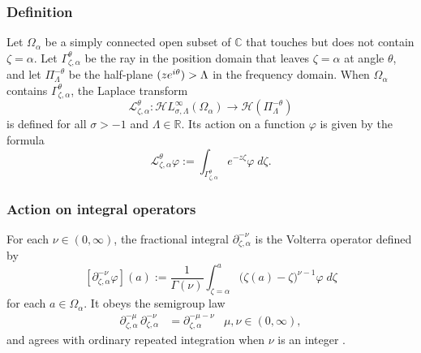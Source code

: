 \documentclass[final]{siamart220329}
\newcommand{\maps}{\colon}
\newcommand{\R}{\mathbb{R}}
\newcommand{\C}{\mathbb{C}}
\let\Re\relax
\DeclareMathOperator{\Re}{Re}
\newcommand{\laplace}{\mathcal{L}}
\newcommand{\fracderiv}[3]{\partial^{#1}_{#2, #3}}
\newcommand{\holo}{\mathcal{H}}
\newcommand{\singexp}[2]{\mathcal{H}L^\infty_{#1, #2}}
\newcommand{\domain}{\Omega}
\begin{document}
\subsubsection{Definition}\label{sec:definition_Laplace}
Let $\domain_\alpha$ be a simply connected open subset of $\C$ that touches but does not contain $\zeta=\alpha$. Let $\Gamma_{\zeta, \alpha}^\theta$ be the ray in the position domain that leaves $\zeta=\alpha$ at angle $\theta$, and let $\Pi^{-\theta}_\Lambda$ be the half-plane $\Re(z e^{i\theta}) > \Lambda$ in the frequency domain. When $\domain_\alpha$ contains $\Gamma_{\zeta, \alpha}^\theta$, the Laplace transform
\[ \laplace_{\zeta, \alpha}^{\theta} \maps \singexp{\sigma}{\Lambda}(\domain_\alpha) \to \holo(\Pi^{-\theta}_\Lambda) \]
is defined for all $\sigma > -1$ and $\Lambda \in \R$. Its action on a function $\varphi$ is given by the formula
\begin{equation}\label{laplace:int}
\laplace_{\zeta, \alpha}^{\theta} \varphi := \int_{\Gamma_{\zeta,\alpha}^\theta} e^{-z\zeta} \varphi\;d\zeta.
\end{equation}

\subsubsection{Action on integral operators}\label{sec:L-int-op}
For each $\nu \in (0, \infty)$, the fractional integral $\partial^{-\nu}_{\zeta, \alpha}$ is the Volterra operator defined by
\[ [\partial^{-\nu}_{\zeta, \alpha} \varphi](a) := \frac{1}{\Gamma(\nu)} \int_{\zeta = \alpha}^a \big(\zeta(a)-\zeta\big)^{\nu-1} \varphi\;d\zeta \]
for each $a \in \domain_\alpha$. It obeys the semigroup law \cite[Section~1.3]{mladenov2014advanced}
\begin{align*}
\fracderiv{-\mu}{\zeta}{\alpha}\,\fracderiv{-\nu}{\zeta}{\alpha} & = \fracderiv{-\mu-\nu}{\zeta}{\alpha} & \mu, \nu \in (0, \infty),
\end{align*}
and agrees with ordinary repeated integration when $\nu$ is an integer \cite[equation~35]{mladenov2014advanced}.
\end{document}
